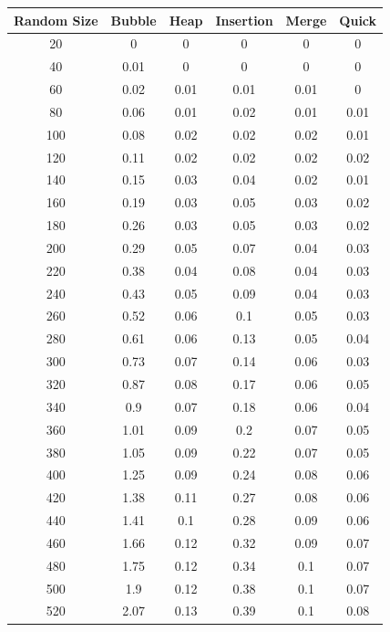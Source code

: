 \documentclass[10pt,a4paper]{article}
\begin{document}
\begin{center}
\begin{table}
\begin{tabular}{| c | c | c | c | c | c |}
\hline
Random Size & Bubble & Heap & Insertion & Merge & Quick \\ \hline 
20 & 0 & 0 & 0 & 0 & 0 \\ \hline 
40 & 0.01 & 0 & 0 & 0 & 0 \\ \hline 
60 & 0.02 & 0.01 & 0.01 & 0.01 & 0 \\ \hline 
80 & 0.06 & 0.01 & 0.02 & 0.01 & 0.01 \\ \hline 
100 & 0.08 & 0.02 & 0.02 & 0.02 & 0.01 \\ \hline 
120 & 0.11 & 0.02 & 0.02 & 0.02 & 0.02 \\ \hline 
140 & 0.15 & 0.03 & 0.04 & 0.02 & 0.01 \\ \hline 
160 & 0.19 & 0.03 & 0.05 & 0.03 & 0.02 \\ \hline 
180 & 0.26 & 0.03 & 0.05 & 0.03 & 0.02 \\ \hline 
200 & 0.29 & 0.05 & 0.07 & 0.04 & 0.03 \\ \hline 
220 & 0.38 & 0.04 & 0.08 & 0.04 & 0.03 \\ \hline 
240 & 0.43 & 0.05 & 0.09 & 0.04 & 0.03 \\ \hline 
260 & 0.52 & 0.06 & 0.1 & 0.05 & 0.03 \\ \hline 
280 & 0.61 & 0.06 & 0.13 & 0.05 & 0.04 \\ \hline 
300 & 0.73 & 0.07 & 0.14 & 0.06 & 0.03 \\ \hline 
320 & 0.87 & 0.08 & 0.17 & 0.06 & 0.05 \\ \hline 
340 & 0.9 & 0.07 & 0.18 & 0.06 & 0.04 \\ \hline 
360 & 1.01 & 0.09 & 0.2 & 0.07 & 0.05 \\ \hline 
380 & 1.05 & 0.09 & 0.22 & 0.07 & 0.05 \\ \hline 
400 & 1.25 & 0.09 & 0.24 & 0.08 & 0.06 \\ \hline 
420 & 1.38 & 0.11 & 0.27 & 0.08 & 0.06 \\ \hline 
440 & 1.41 & 0.1 & 0.28 & 0.09 & 0.06 \\ \hline 
460 & 1.66 & 0.12 & 0.32 & 0.09 & 0.07 \\ \hline 
480 & 1.75 & 0.12 & 0.34 & 0.1 & 0.07 \\ \hline 
500 & 1.9 & 0.12 & 0.38 & 0.1 & 0.07 \\ \hline 
520 & 2.07 & 0.13 & 0.39 & 0.1 & 0.08 \\ \hline 

\end{tabular}
\end{table}
\end{center}
\end{document}
